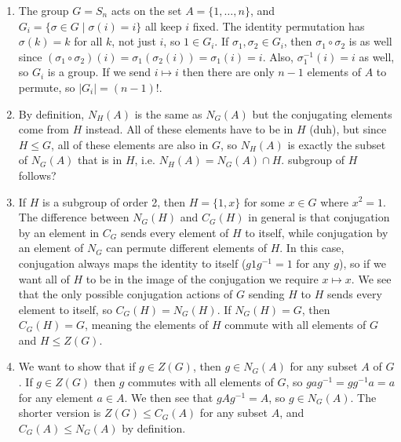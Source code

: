 \documentclass[]{article}
\newcommand{\abs}[1]{\left\vert #1 \right\vert}
\begin{document}
\begin{enumerate}
\item The group $G = S_n$ acts on the set $A = \{1,\ldots ,n\}$, and $G_i = \{ \sigma\in G \mid \sigma (i) = i \}$ all keep $i$ fixed. The identity permutation has $\sigma(k) = k$ for all $k$, not just $i$, so $1 \in G_i$. If $\sigma_1, \sigma_2 \in G_i$, then $\sigma_1 \circ \sigma_2$ is as well since $(\sigma_1\circ \sigma_2)(i) = \sigma_1(\sigma_2(i)) = \sigma_1(i) = i$. Also, $\sigma_1^{-1}(i) = i$ as well, so $G_i$ is a group. If we send $i \mapsto i$ then there are only $n-1$ elements of $A$ to permute, so $\abs{G_i} = (n-1)!$.


\item By definition, $N_H(A)$ is the same as $N_G(A)$ but the conjugating elements come from $H$ instead. All of these elements have to be in $H$ (duh), but since $H \leq G$, all of these elements are also in $G$, so $N_H(A)$ is exactly the subset of $N_G(A)$ that is in $H$, i.e. $N_H(A) = N_G(A) \cap H$. {\color{red} subgroup of $H$ follows?}


\item If $H$ is a subgroup of order 2, then $H = \{1, x\}$ for some $x\in G$ where $x^2 = 1$. The difference between $N_G(H)$ and $C_G(H)$ in general is that conjugation by an element in $C_G$ sends every element of $H$ to itself, while conjugation by an element of $N_G$ can permute different elements of $H$. In this case, conjugation always maps the identity to itself ($g1g^{-1} = 1$ for any $g$), so if we want all of $H$ to be in the image of the conjugation we require $x \mapsto x$. We see that the only possible conjugation actions of $G$ sending $H$ to $H$ sends every element to itself, so $C_G(H) = N_G(H)$. If $N_G(H) = G$, then $C_G(H) = G$, meaning the elements of $H$ commute with all elements of $G$ and $H \leq Z(G)$. 


\item We want to show that if $g \in Z(G)$, then $g \in N_G(A)$ for any subset $A$ of $G$. If $g \in Z(G)$ then $g$ commutes with all elements of $G$, so $gag^{-1} = gg^{-1}a = a$ for any element $a \in A$. We then see that $gAg^{-1} = A$, so $g \in N_G(A)$. The shorter version is $Z(G) \leq C_G(A)$ for any subset $A$, and $C_G(A) \leq N_G(A)$ by definition.



\end{enumerate}
\end{document}
